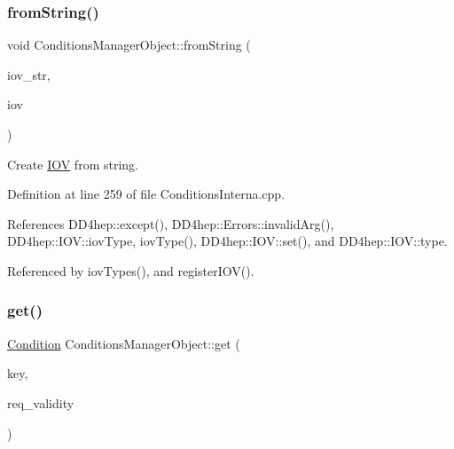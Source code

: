 \subsubsection{\texorpdfstring{from\+String()}{fromString()}}
{\footnotesize\ttfamily void Conditions\+Manager\+Object\+::from\+String (\begin{DoxyParamCaption}\item[{const std\+::string \&}]{iov\+\_\+str,  }\item[{\hyperlink{class_d_d4hep_1_1_i_o_v}{I\+OV} \&}]{iov }\end{DoxyParamCaption})}



Create \hyperlink{class_d_d4hep_1_1_i_o_v}{I\+OV} from string. 



Definition at line 259 of file Conditions\+Interna.\+cpp.



References D\+D4hep\+::except(), D\+D4hep\+::\+Errors\+::invalid\+Arg(), D\+D4hep\+::\+I\+O\+V\+::iov\+Type, iov\+Type(), D\+D4hep\+::\+I\+O\+V\+::set(), and D\+D4hep\+::\+I\+O\+V\+::type.



Referenced by iov\+Types(), and register\+I\+O\+V().

\hypertarget{class_d_d4hep_1_1_conditions_1_1_conditions_manager_object_a1a0fa030dcff8247de5ed6f93ccb16c5}{}\label{class_d_d4hep_1_1_conditions_1_1_conditions_manager_object_a1a0fa030dcff8247de5ed6f93ccb16c5} 
\subsubsection{\texorpdfstring{get()}{get()}}
{\footnotesize\ttfamily \hyperlink{class_d_d4hep_1_1_conditions_1_1_condition}{Condition} Conditions\+Manager\+Object\+::get (\begin{DoxyParamCaption}\item[{\hyperlink{class_d_d4hep_1_1_conditions_1_1_condition_a7528efa762e8cc072ef80ea67c3531f9}{Condition\+::key\+\_\+type}}]{key,  }\item[{const \hyperlink{class_d_d4hep_1_1_conditions_1_1_conditions_manager_object_a0190ec510ca46da4a1cc908ac3c3a1dd}{iov\+\_\+type} \&}]{req\+\_\+validity }\end{DoxyParamCaption})}



